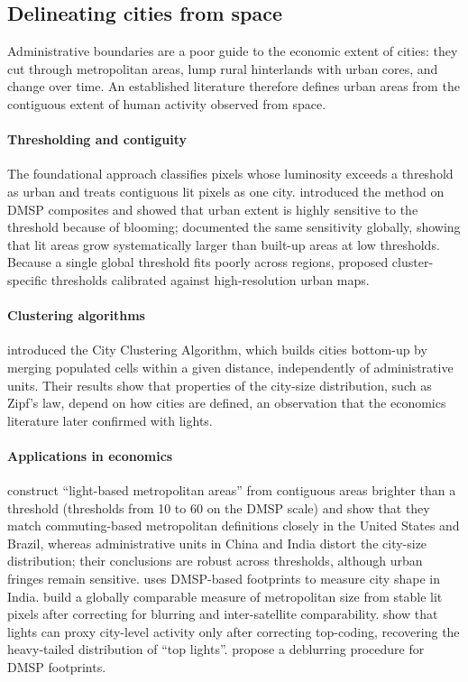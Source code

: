 \documentclass[11pt,a4paper]{article}
\begin{document}
\subsection{Delineating cities from space}\label{sec:litcities}

Administrative boundaries are a poor guide to the economic extent of cities: they cut through metropolitan areas, lump rural hinterlands with urban cores, and change over time. An established literature therefore defines urban areas from the contiguous extent of human activity observed from space.

\paragraph{Thresholding and contiguity}
The foundational approach classifies pixels whose luminosity exceeds a threshold as urban and treats contiguous lit pixels as one city. \citet{Imhoff1997} introduced the method on DMSP composites and showed that urban extent is highly sensitive to the threshold because of blooming; \citet{Small2005} documented the same sensitivity globally, showing that lit areas grow systematically larger than built-up areas at low thresholds. Because a single global threshold fits poorly across regions, \citet{Zhou2014} proposed cluster-specific thresholds calibrated against high-resolution urban maps.

\paragraph{Clustering algorithms}
\citet{Rozenfeld2008,Rozenfeld2011} introduced the City Clustering Algorithm, which builds cities bottom-up by merging populated cells within a given distance, independently of administrative units. Their results show that properties of the city-size distribution, such as Zipf's law, depend on how cities are defined, an observation that the economics literature later confirmed with lights.

\paragraph{Applications in economics}
\citet{Dingel2021} construct ``light-based metropolitan areas'' from contiguous areas brighter than a threshold (thresholds from 10 to 60 on the DMSP scale) and show that they match commuting-based metropolitan definitions closely in the United States and Brazil, whereas administrative units in China and India distort the city-size distribution; their conclusions are robust across thresholds, although urban fringes remain sensitive. \citet{Harari2020} uses DMSP-based footprints to measure city shape in India. \citet{ChMartinVargas2021} build a globally comparable measure of metropolitan size from stable lit pixels after correcting for blurring and inter-satellite comparability. \citet{Bluhm2022} show that lights can proxy city-level activity only after correcting top-coding, recovering the heavy-tailed distribution of ``top lights''. \citet{Abrahams2018} propose a deblurring procedure for DMSP footprints.
\end{document}

